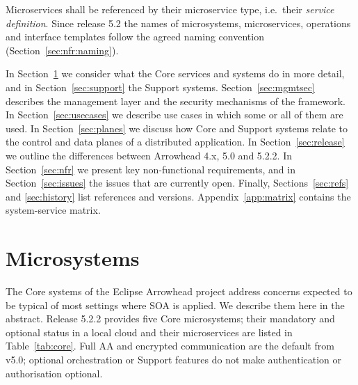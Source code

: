 \documentclass[a4paper]{arrowhead}
\begin{document}
Microservices shall be referenced by their microservice type, i.e.\ their \emph{service
definition}. Since release 5.2 the names of microsystems, microservices, operations and
interface templates follow the agreed naming convention \cite{naming2}
(Section~\ref{sec:nfr:naming}).

In Section~\ref{sec:microsystems} we consider what the Core services and systems do in more
detail, and in Section~\ref{sec:support} the Support systems. Section~\ref{sec:mgmtsec}
describes the management layer and the security mechanisms of the framework. In
Section~\ref{sec:usecases} we
describe use cases in which some or all of them are used. In Section~\ref{sec:planes} we discuss
how Core and Support systems relate to the control and data planes of a distributed application.
In Section~\ref{sec:release} we outline the differences between Arrowhead 4.x, 5.0 and 5.2.2. In
Section~\ref{sec:nfr} we present key non-functional requirements, and in
Section~\ref{sec:issues} the issues that are currently open. Finally,
Sections~\ref{sec:refs} and \ref{sec:history} list references and versions.
Appendix~\ref{app:matrix} contains the system-service matrix.

\newpage
\section{Microsystems}
\label{sec:microsystems}

The Core systems of the Eclipse Arrowhead project address concerns expected to be typical of
most settings where SOA is applied. We describe them here in the abstract. Release 5.2.2
provides five Core microsystems; their mandatory and optional status in a local cloud and
their microservices are listed in Table~\ref{tab:core}. Full AA and encrypted
communication are the default from v5.0; optional orchestration or Support features
do not make authentication or authorisation optional.
\end{document}
